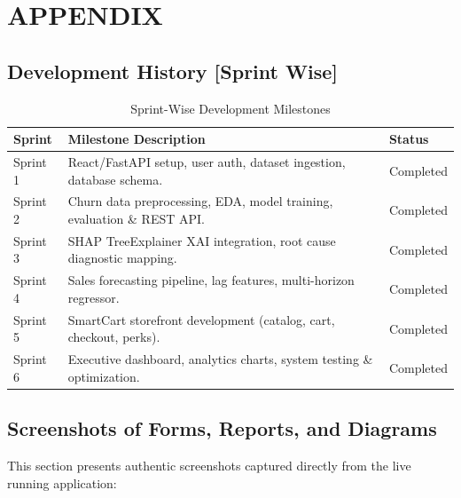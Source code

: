 \documentclass[12pt,a4paper]{article}
\begin{document}
\newpage

\section{APPENDIX}\label{chap:12}

\subsection{Development History [Sprint Wise]}\label{sub:12.1}

\begin{table}[H]
\centering
\small
\caption{Sprint-Wise Development Milestones}
\begin{tabularx}{\linewidth}{|C{1.8cm}|Y|C{2.5cm}|}
\hline
\textbf{Sprint} & \textbf{Milestone Description} & \textbf{Status} \\ \hline
Sprint 1 & React/FastAPI setup, user auth, dataset ingestion, database schema. & Completed \\ \hline
Sprint 2 & Churn data preprocessing, EDA, model training, evaluation \& REST API. & Completed \\ \hline
Sprint 3 & SHAP TreeExplainer XAI integration, root cause diagnostic mapping. & Completed \\ \hline
Sprint 4 & Sales forecasting pipeline, lag features, multi-horizon regressor. & Completed \\ \hline
Sprint 5 & SmartCart storefront development (catalog, cart, checkout, perks). & Completed \\ \hline
Sprint 6 & Executive dashboard, analytics charts, system testing \& optimization. & Completed \\ \hline
\end{tabularx}
\label{tab:sprint_milestones}
\end{table}

\subsection{Screenshots of Forms, Reports, and Diagrams}\label{sub:12.2}

This section presents authentic screenshots captured directly from the live running application:
\end{document}
